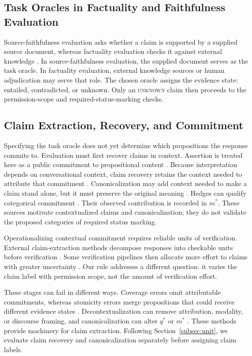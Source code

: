 \documentclass{clv2025}
\begin{document}
\subsection{Task Oracles in Factuality and Faithfulness Evaluation}

Source-faithfulness evaluation asks whether a claim is supported by a
supplied source document, whereas factuality evaluation checks it against
external knowledge \citep{maynez_faithfulness_2020,kryscinski_evaluating_2020}.
In source-faithfulness evaluation, the supplied document serves as the task
oracle. In factuality evaluation, external knowledge sources or human
adjudication may serve that role.
The chosen oracle assigns the evidence state: entailed, contradicted, or
unknown. Only an \textsc{unknown} claim then proceeds to the permission-scope
and required-status-marking checks.

\subsection{Claim Extraction, Recovery, and Commitment}\label{subsec:extraction}

Specifying the task oracle does not yet determine which propositions the
response commits to. Evaluation must first recover claims in context.
Assertion is treated here as a public commitment to propositional content
\citep{stalnaker_assertion_1978}.
Because interpretation depends on conversational context, claim recovery
retains the context needed to attribute that commitment
\citep{clark_using_1996}.
Canonicalization may add context needed to make a claim stand alone, but it
must preserve the original meaning \citep{choi_decontextualization_2021}.
Hedges can qualify categorical commitment \citep{hyland_hedging_1996}.
Their observed contribution is recorded in $m^*$.
These sources motivate contextualized claims and canonicalization; they do not
validate the proposed categories of required status marking.

Operationalizing contextual commitment requires reliable units of
verification. External claim-extraction methods decompose responses into
checkable units before verification
\citep{min_factscore_2023,song_veriscore_2024,metropolitansky_claimify_2025}.
Some verification pipelines then allocate more effort to claims with greater
uncertainty \citep{hassan_factor_2026}.
Our rule addresses a different question: it varies the claim label with
permission scope, not the amount of verification effort.

These stages can fail in different ways.
Coverage errors omit attributable commitments, whereas atomicity errors merge
propositions that could receive different evidence states
\citep{metropolitansky_claimify_2025,wanner_closer_2024}.
Decontextualization can remove attribution, modality, or discourse framing,
and canonicalization can alter $q^*$ or $m^*$
\citep{wanner_closer_2024,choi_decontextualization_2021}.
These methods provide machinery for claim extraction.
Following Section~\ref{subsec:unit}, we evaluate claim recovery and
canonicalization separately before assigning claim labels.
\end{document}
